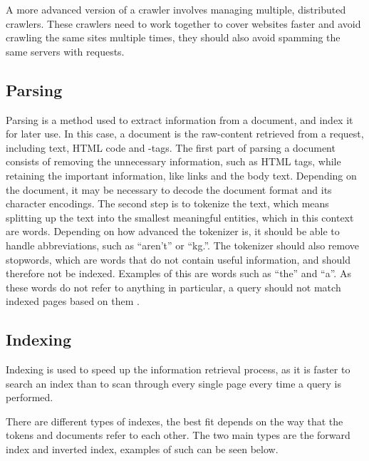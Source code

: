 
A more advanced version of a crawler involves managing multiple, distributed
crawlers. These crawlers need to work together to cover websites faster and
avoid crawling the same sites multiple times, they should also avoid spamming
the same servers with requests.


\subsection{Parsing} \label{sec:parsing}
Parsing is a method used to extract information from a document, and index it
for later use. In this case, a document is the raw-content retrieved from a request,
including text, HTML code and -tags.
The first part of parsing a document consists of removing the unnecessary
information, such as HTML tags, while retaining the important information, like
links and the body text. Depending on the document, it may be necessary to
decode the document format and its character encodings.
The second step is to tokenize the text, which means splitting up the text into
the smallest meaningful entities, which in this context are words. Depending on
how advanced the tokenizer is, it should be able to handle abbreviations, such
as ``aren't'' or ``kg.''. The tokenizer should also remove stopwords, which are
words that do not contain useful information, and should therefore not
be indexed. Examples of this are words such as ``the'' and ``a''. As these words
do not refer to anything in particular, a query should not match indexed pages
based on them \citep[Ch. 2]{manning2008introduction}.

\subsection{Indexing}
Indexing is used to speed up the information retrieval process, as it is faster
to search an index than to scan through every single page every time a query is
performed.

There are different types of indexes, the best fit depends on the way
that the tokens and documents refer to each other. The two main types are the
forward index and inverted index, examples of such can be seen below.


